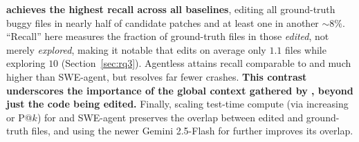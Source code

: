 \textbf{\cresearcher{} achieves the highest recall across all baselines}, editing all ground-truth buggy files in nearly half of candidate patches and at least one in another $\sim8\%$. ``Recall'' here measures the fraction of ground-truth files in those \emph{edited}, not merely \emph{explored}, making it notable that \cresearcher{} edits on average only $1.1$ files while exploring $10$ (Section~\ref{sec:rq3}). Agentless attains recall comparable to \cresearcher{} and much higher than SWE-agent, but resolves far fewer crashes. \textbf{This contrast underscores the importance of the global context gathered by \cresearcher{}, beyond just the code being edited.}
Finally, scaling test-time compute (via increasing \maxcalls{} or P@$k$) for \cresearcher{} and SWE-agent preserves the overlap between edited and ground-truth files, and using the newer Gemini 2.5-Flash for \cresearcher{} further improves its overlap.
